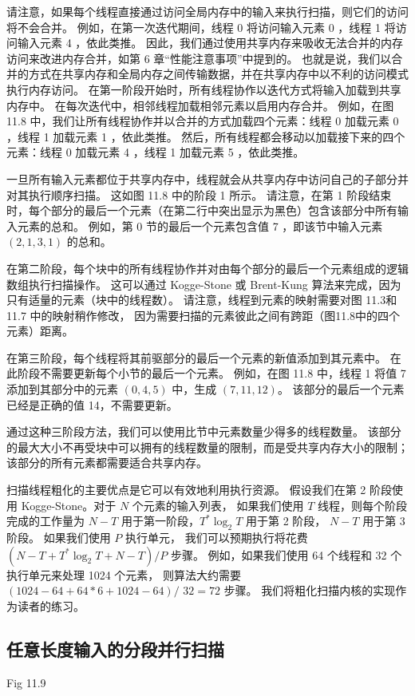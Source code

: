 请注意，如果每个线程直接通过访问全局内存中的输入来执行扫描，则它们的访问将不会合并。 
例如，在第一次迭代期间，线程 0 将访问输入元素 0 ，线程 1 将访问输入元素 4 ，依此类推。 
因此，我们通过使用共享内存来吸收无法合并的内存访问来改进内存合并，如第 6 章“性能注意事项”中提到的。 
也就是说，我们以合并的方式在共享内存和全局内存之间传输数据，并在共享内存中以不利的访问模式执行内存访问。 
在第一阶段开始时，所有线程协作以迭代方式将输入加载到共享内存中。 在每次迭代中，相邻线程加载相邻元素以启用内存合并。 
例如，在图 11.8 中，我们让所有线程协作并以合并的方式加载四个元素：线程 0 加载元素 0 ，线程 1 加载元素 1 ，依此类推。 
然后，所有线程都会移动以加载接下来的四个元素：线程 0 加载元素 4 ，线程 1 加载元素 5 ，依此类推。

一旦所有输入元素都位于共享内存中，线程就会从共享内存中访问自己的子部分并对其执行顺序扫描。 这如图 11.8 中的阶段 1 所示。 
请注意，在第 1 阶段结束时，每个部分的最后一个元素（在第二行中突出显示为黑色）包含该部分中所有输入元素的总和。 
例如，第 0 节的最后一个元素包含值 7 ，即该节中输入元素 $(2,1,3,1)$ 的总和。

在第二阶段，每个块中的所有线程协作并对由每个部分的最后一个元素组成的逻辑数组执行扫描操作。 
这可以通过 Kogge-Stone 或 Brent-Kung 算法来完成，因为只有适量的元素（块中的线程数）。 
请注意，线程到元素的映射需要对图 11.3和11.7 中的映射稍作修改，
因为需要扫描的元素彼此之间有跨距（图11.8中的四个元素）距离。

在第三阶段，每个线程将其前驱部分的最后一个元素的新值添加到其元素中。 在此阶段不需要更新每个小节的最后一个元素。 
例如，在图 11.8 中，线程 1 将值 7 添加到其部分中的元素 $(0,4,5)$ 中，生成 $(7,11,12)$。 
该部分的最后一个元素已经是正确的值 14，不需要更新。

通过这种三阶段方法，我们可以使用比节中元素数量少得多的线程数量。 
该部分的最大大小不再受块中可以拥有的线程数量的限制，而是受共享内存大小的限制； 该部分的所有元素都需要适合共享内存。

扫描线程粗化的主要优点是它可以有效地利用执行资源。 假设我们在第 2 阶段使用 Kogge-Stone。对于 $N$ 个元素的输入列表，
如果我们使用 $T$ 线程，则每个阶段完成的工作量为 $N-T$ 用于第一阶段，$T^{*} \log _{2} T$ 用于第 2 阶段，
$N-T$ 用于第 3 阶段。 如果我们使用 $P$ 执行单元，
我们可以预期执行将花费 $\left(N-T+T^{*} \log _{2} T+N-T\right) / P$ 步骤。 
例如，如果我们使用 64 个线程和 32 个执行单元来处理 1024 个元素，
则算法大约需要 $(1024-64+64 * 6+1024-64) /$ $32=72$ 步骤。 我们将粗化扫描内核的实现作为读者的练习。

\subsection{任意长度输入的分段并行扫描}
{\color{red} Fig 11.9}

